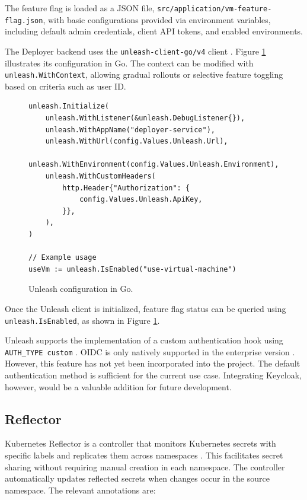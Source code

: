 The feature flag is loaded as a JSON file, \texttt{src/application/vm-feature-flag\allowbreak.json}, with basic configurations provided via environment variables, including default admin credentials, client API tokens, and enabled environments.

The Deployer backend uses the \texttt{unleash-client-go/v4} client \parencite{unleash_client_go}. Figure \ref{fig:unleash_config} illustrates its configuration in Go. The context can be modified with \texttt{unleash\allowbreak.WithContext}, allowing gradual rollouts or selective feature toggling based on criteria such as user ID.

\begin{figure}[h]
    \centering
\begin{verbatim}
unleash.Initialize(
    unleash.WithListener(&unleash.DebugListener{}),
    unleash.WithAppName("deployer-service"),
    unleash.WithUrl(config.Values.Unleash.Url),
    unleash.WithEnvironment(config.Values.Unleash.Environment),
    unleash.WithCustomHeaders(
        http.Header{"Authorization": {
            config.Values.Unleash.ApiKey,
        }},
    ),
)

// Example usage
useVm := unleash.IsEnabled("use-virtual-machine")
\end{verbatim}
    \caption{Unleash configuration in Go.}
    \label{fig:unleash_config}
\end{figure}

Once the Unleash client is initialized, feature flag status can be queried using \texttt{unleash.IsEnabled}, as shown in Figure \ref{fig:unleash_config}.

Unleash supports the implementation of a custom authentication hook using \texttt{AUTH\_TYPE custom} \parencite{UnleashAuth2025}. OIDC is only natively supported in the enterprise version \parencite{UnleashSSO2025}. However, this feature has not yet been incorporated into the project. The default authentication method is sufficient for the current use case. Integrating Keycloak, however, would be a valuable addition for future development.

\subsection{Reflector}
Kubernetes Reflector is a controller that monitors Kubernetes secrets with specific labels and replicates them across namespaces \parencite{kubernetes_reflector}. This facilitates secret sharing without requiring manual creation in each namespace. The controller automatically updates reflected secrets when changes occur in the source namespace. The relevant annotations are:


